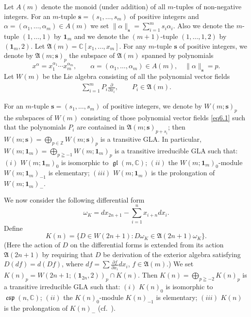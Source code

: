 \documentclass[11pt]{article}
\numberwithin{equation}{section}
\numberwithin{theorem}{section}
\numberwithin{proposition}{section}
\numberwithin{lemma}{section}
\numberwithin{corollary}{section}
\numberwithin{definition}{section}
\numberwithin{example}{section}
\numberwithin{remark}{section}
\numberwithin{note}{section}
\newcommand{\gl}{\operatorname{\mathfrak{gl}}}
\newcommand{\csp}{\operatorname{\mathfrak{csp}}}
\begin{document}
Let $A(m)$ denote the monoid (under addition) of all $m$-tuples of
non-negative integers.
For an $m$-tuple
$\bm s=(s_1,\dots,s_m)$ of positive integers and
$\alpha=(\alpha_1,\dots,\alpha_m)\in A(m)$
we set $\|\alpha\|_{\bm s}=\sum\limits_{i=1}^ms_i\alpha_i$.
Also we denote the $m$-tuple $(1,\dots,1)$ by ${\bm 1}_m$
and  we denote the
$(m+1)$-tuple $(1,\dots,1,2)$ by $({\bm 1}_m,2)$.
Let $\mathfrak A(m)=\mathbb C[x_1,\dots,x_m]$.
For any $m$-tuple $\bm s$
of positive integers, we denote by $\mathfrak A(m;\bm s)_p$
the subspace of $\mathfrak A(m)$ spanned by polynomials
\[
x^{\alpha}=x_1^{\alpha_1}\cdots x_m^{\alpha_m}, \qquad
 \alpha=(\alpha_1,\dots,\alpha_m)\in A(m),\quad  \|\alpha\|_{\bm s}=p .
\]
Let $W(m)$ be the Lie algebra consisting of all the polynomial vector f\/ields
\begin{gather}\label{eq6.1}
\sum\limits_{i=1}^m P_i\frac{\partial}{\partial x_i},
\qquad  P_i\in\mathfrak A(m) .
\end{gather}

For an $m$-tuple $\bm s=(s_1,\dots,s_m)$ of positive integers,
we denote by $W(m;\bm s)_p$
the subspaces of $W(m)$ consisting of those polynomial vector f\/ields \eqref{eq6.1}
such that the polynomials $P_i$ are contained in
$\mathfrak A(m;\bm s)_{p+s_i}$;
then
$W(m;\bm s)=\bigoplus\limits_{p\in\mathbb Z}W(m;\bm s)_p$
is a transitive GLA.
In particular, $W(m;{\bm 1}_m)=\bigoplus\limits_{p\geqq-1}W(m;{\bm 1}_m)_p$ is
a transitive irreducible GLA
such that: $(i)$ $W(m;{\bm 1}_m)_0$ is isomorphic to $\gl(m,\mathbb C)$;
$(ii)$ the $W(m;{\bm 1}_m)_0$-module $W(m;{\bm 1}_m)_{-1}$ is elementary; $(iii)$
$W(m;{\bm 1}_m)$ is the prolongation of $W(m;{\bm 1}_m)_-$.

We now consider the following dif\/ferential form
\[
\omega_K=dx_{2n+1}-\sum_{i=1}^nx_{i+n}dx_{i}.
\]
Def\/ine
\[
K(n)=\{ D\in W(2n+1):D\omega_K\in\mathfrak A(2n+1)\omega_K \}.
\]
(Here the action of $D$ on the dif\/ferential forms is extended from
its action $\mathfrak A(2n+1)$ by requiring that $D$ be derivation of
the exterior algebra satisfying $D(df)=d(Df)$, where
$df=\sum\frac{\partial f}{\partial x_i}dx_i$, $f\in\mathfrak A(m)$.)
We set $K(n)_p=W(2n+1;({\bm 1}_{2n},2))_p\cap K(n)$.
Then $K(n)=\bigoplus\limits_{p\geqq-2}K(n)_p$
is a transitive irreducible GLA
such that: $(i)$
$K(n)_0$ is isomorphic to $\csp(n,\mathbb C)$;
$(ii)$ the $K(n)_0$-module $K(n)_{-1}$ is elementary;
$(iii)$ $K(n)$ is the prolongation of $K(n)_-$
(cf.~\cite{kac68:1, mor88:1}).
\end{document}
